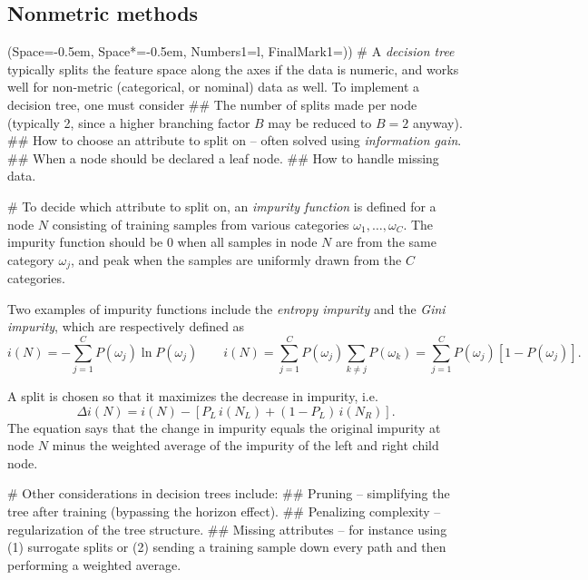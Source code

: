 \documentclass[12pt, a4paper]{article}
\newcommand{\listSpace}{-0.5em}%
\begin{document}
\subsection{Nonmetric methods}
\begin{easylist}[itemize]
\ListProperties(Space=\listSpace, Space*=\listSpace, Numbers1=l, FinalMark1={)})
# A \emph{decision tree} typically splits the feature space along the axes if the data is numeric, and works well for non-metric (categorical, or nominal) data as well.
To implement a decision tree, one must consider
## The number of splits made per node (typically 2, since a higher branching factor $B$ may be reduced to $B=2$ anyway).
## How to choose an attribute to split on -- often solved using \emph{information gain}.
## When a node should be declared a leaf node.
## How to handle missing data.

# To decide which attribute to split on, an \emph{impurity function} is defined for a node $N$ consisting of training samples from various categories $\omega_1, \dots, \omega_C$.
The impurity function should be 0 when all samples in node $N$ are from the same category $\omega_j$, and peak when the samples are uniformly drawn from the $C$ categories.

Two examples of impurity functions include the \emph{entropy impurity} and the \emph{Gini impurity}, which are respectively defined as
\begin{equation*}
	i(N) = - \sum_{j=1}^{C} P(\omega_j) \ln P(\omega_j) 
	\qquad
	i(N) =  \sum_{j=1}^{C} P(\omega_j) \sum_{k\neq j} P(\omega_k)
	= \sum_{j=1}^{C} P(\omega_j) \left[ 1 - P(\omega_j) \right].
\end{equation*}

A split is chosen so that it maximizes the decrease in impurity, i.e.
\begin{equation*}
	\Delta i(N) = i(N) - \left[ P_L \, i(N_L) + (1 - P_L) \, i(N_R)\right].
\end{equation*}
The equation says that the change in impurity equals the original impurity at node $N$ minus the weighted average of the impurity of the left and right child node.

# Other considerations in decision trees include:
## Pruning -- simplifying the tree after training (bypassing the horizon effect).
## Penalizing complexity -- regularization of the tree structure.
## Missing attributes -- for instance using (1) surrogate splits or (2) sending a training sample down every path and then performing a weighted average.


\end{easylist}
\end{document}
